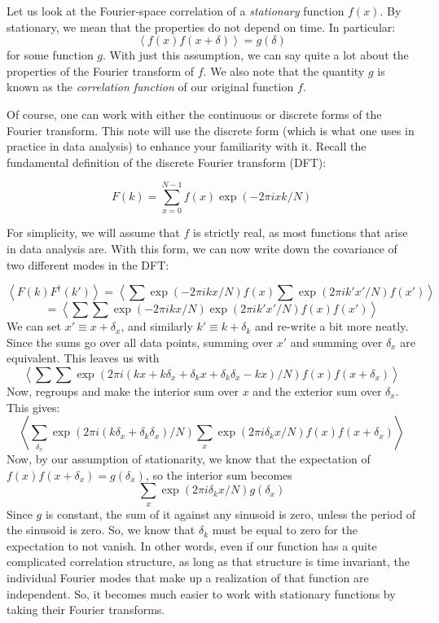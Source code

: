 \documentclass[letterpaper,11pt,preprint]{aastex}
\begin{document}
\pagestyle{plain}

Let us look at the Fourier-space correlation of a
{\textit{stationary}} function $f(x)$.  By stationary, we mean that the
properties do not depend on time.  In particular:
$$ \left < f(x)f(x+\delta) \right > = g(\delta)$$
for some function $g$.  With just this assumption, we can say quite a
lot about the properties of the Fourier transform of $f$.  We also
note that the quantity $g$ is known as the {\textit{correlation
    function}} of our original function $f$.

Of course, one can work with either the continuous or discrete forms
of the Fourier transform.  This note will use the discrete form (which
is what one uses in practice in data analysis) to enhance your
familiarity with it.  Recall the fundamental definition of the
discrete Fourier transform (DFT):

$$F(k) = \sum_{x=0}^{N-1} f(x) \exp(-2\pi i x k/N)$$

For simplicity, we will assume that $f$ is strictly real, as most
functions that arise in data analysis are.  With this form, we can now
write down the covariance of two different modes in the DFT:

$$\left < F(k) F^\dagger(k') \right > = \left < \sum \exp(-2 \pi i k
x/N)f(x) \sum \exp(2 \pi i k' x'/N) f(x') \right >$$
$$= \left < \sum \sum \exp(-2 \pi i k x/N) \exp(2 \pi i k'
x'/N)f(x)f(x') \right >$$
We can set $x' \equiv x + \delta_x$, and similarly $k' \equiv
k+\delta_k$ and re-write a bit more neatly.  Since the sums go over
all data points, summing over $x'$ and summing over $\delta_x$ are
equivalent.  This leaves us with 
$$\left < \sum \sum \exp(2\pi i (kx+k\delta_x + \delta_k x + \delta_k
\delta_x - kx)/N )f(x) f(x+\delta_x) \right >$$
Now, regroups and make the interior sum over $x$ and the exterior sum
over $\delta_x$.  This gives:
$$\left < \sum_{\delta_x} \exp(2\pi i (k\delta_x +\delta_k \delta_x)/N)
\sum_x \exp(2\pi i \delta_k x/N)f(x)f(x+\delta_x) \right > $$
Now, by our assumption of stationarity, we know that the expectation
of $f(x)f(x+\delta_x)=g(\delta_x)$, so the interior sum becomes 
$$\sum_x \exp(2\pi i \delta_k x/N)g(\delta_x)$$
Since $g$ is constant, the sum of it against any sinusoid is zero,
unless the period of the sinusoid is zero.  So, we know that
$\delta_k$ must be equal to zero for the expectation to not vanish.
In other words, even if our function has a quite complicated
correlation structure, as long as that structure is time invariant,
the individual Fourier modes that make up a realization of that
function are independent.  So, it becomes much easier to work with
stationary functions by taking their Fourier transforms.
\end{document}
